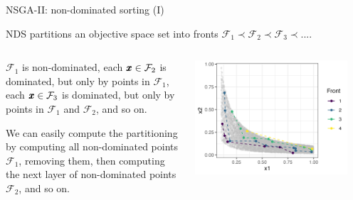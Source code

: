 \documentclass[11pt,compress,t,notes=noshow,xcolor=table]{beamer}
\newcommand{\xx}{\conf}     %
\begin{document}
\begin{vbframe}{NSGA-II: non-dominated sorting (I)}

NDS partitions an objective space set into fronts $\mathcal{F}_1 \prec \mathcal{F}_2 \prec \mathcal{F}_3 \prec ... $.

\begin{columns}
\begin{column}{0.4\textwidth}
\begin{itemize}{\small
    \item $\mathcal{F}_1$ is non-dominated, 
      each $\xx \in \mathcal{F}_2$ is dominated, but only by points in $\mathcal{F}_1$, 
      each $\xx \in \mathcal{F}_3$ is dominated, but only by points in $\mathcal{F}_1$ and $\mathcal{F}_2$, 
      and so on. 
    \item We can easily compute the partitioning by computing all non-dominated points  $\mathcal{F}_1$,
        removing them, then computing the next layer of non-dominated points $\mathcal{F}_2$, and so on.}
\end{itemize}
\end{column}

\begin{column}{0.6\textwidth}
\vspace{0.3cm}
\begin{center}
\includegraphics[width = 0.9\textwidth]{figure_man/NSGA2_NDS.png}
\end{center}
\end{column}
\end{columns}

\end{vbframe}
\end{document}
